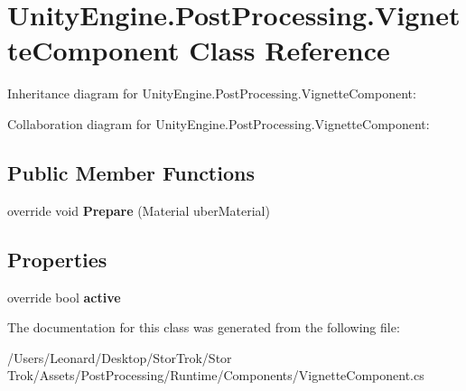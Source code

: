 \hypertarget{class_unity_engine_1_1_post_processing_1_1_vignette_component}{}\section{Unity\+Engine.\+Post\+Processing.\+Vignette\+Component Class Reference}
\label{class_unity_engine_1_1_post_processing_1_1_vignette_component}


Inheritance diagram for Unity\+Engine.\+Post\+Processing.\+Vignette\+Component\+:


Collaboration diagram for Unity\+Engine.\+Post\+Processing.\+Vignette\+Component\+:
\subsection*{Public Member Functions}
\begin{DoxyCompactItemize}
\item 
\mbox{\label{class_unity_engine_1_1_post_processing_1_1_vignette_component_a7f8b6fca0970717decfc4148d42c43be}} 
override void {\bfseries Prepare} (Material uber\+Material)
\end{DoxyCompactItemize}
\subsection*{Properties}
\begin{DoxyCompactItemize}
\item 
\mbox{\label{class_unity_engine_1_1_post_processing_1_1_vignette_component_a74f4203a32fb845ba8aec4d7b204c80f}} 
override bool {\bfseries active}
\end{DoxyCompactItemize}


The documentation for this class was generated from the following file\+:\begin{DoxyCompactItemize}
\item 
/\+Users/\+Leonard/\+Desktop/\+Stor\+Trok/\+Stor Trok/\+Assets/\+Post\+Processing/\+Runtime/\+Components/Vignette\+Component.\+cs\end{DoxyCompactItemize}
